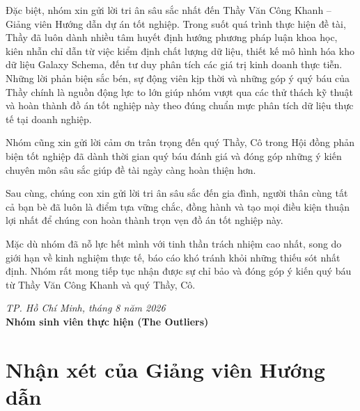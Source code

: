 \documentclass[12pt, a4paper]{report}
\begin{document}
Đặc biệt, nhóm xin gửi lời tri ân sâu sắc nhất đến Thầy Văn Công Khanh -- Giảng viên Hướng dẫn dự án tốt nghiệp. Trong suốt quá trình thực hiện đề tài, Thầy đã luôn dành nhiều tâm huyết định hướng phương pháp luận khoa học, kiên nhẫn chỉ dẫn từ việc kiểm định chất lượng dữ liệu, thiết kế mô hình hóa kho dữ liệu Galaxy Schema, đến tư duy phân tích các giá trị kinh doanh thực tiễn. Những lời phản biện sắc bén, sự động viên kịp thời và những góp ý quý báu của Thầy chính là nguồn động lực to lớn giúp nhóm vượt qua các thử thách kỹ thuật và hoàn thành đồ án tốt nghiệp này theo đúng chuẩn mực phân tích dữ liệu thực tế tại doanh nghiệp.

Nhóm cũng xin gửi lời cảm ơn trân trọng đến quý Thầy, Cô trong Hội đồng phản biện tốt nghiệp đã dành thời gian quý báu đánh giá và đóng góp những ý kiến chuyên môn sâu sắc giúp đề tài ngày càng hoàn thiện hơn.

Sau cùng, chúng con xin gửi lời tri ân sâu sắc đến gia đình, người thân cùng tất cả bạn bè đã luôn là điểm tựa vững chắc, đồng hành và tạo mọi điều kiện thuận lợi nhất để chúng con hoàn thành trọn vẹn đồ án tốt nghiệp này.

Mặc dù nhóm đã nỗ lực hết mình với tinh thần trách nhiệm cao nhất, song do giới hạn về kinh nghiệm thực tế, báo cáo khó tránh khỏi những thiếu sót nhất định. Nhóm rất mong tiếp tục nhận được sự chỉ bảo và đóng góp ý kiến quý báu từ Thầy Văn Công Khanh và quý Thầy, Cô.

\vspace{0.8cm}
\begin{flushright}
    \textit{TP. Hồ Chí Minh, tháng 8 năm 2026} \\
    \textbf{Nhóm sinh viên thực hiện (The Outliers)}
\end{flushright}

\chapter*{Nhận xét của Giảng viên Hướng dẫn}
\label{chap:nhanxet_gvhd}
\end{document}
